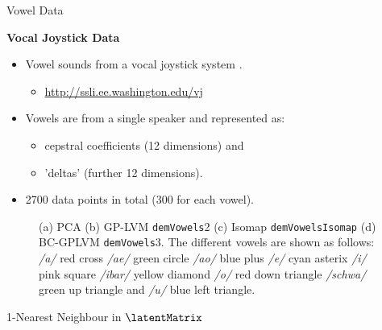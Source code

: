 Vowel Data

\textbf{Vocal Joystick Data}
\begin{itemize}
\item Vowel sounds from a vocal joystick system \cite{Bilmes:vocal06}.

\begin{itemize}
\item \url{http://ssli.ee.washington.edu/vj}
\end{itemize}
\item Vowels are from a single speaker and represented as: 

\begin{itemize}
\item cepstral coefficients (12 dimensions) and 
\item 'deltas' (further 12 dimensions).
\end{itemize}
\item 2700 data points in total (300 for each vowel).
\end{itemize}
%
\begin{figure}
\hfill{}

\hfill{}

\caption{(a) PCA (b) GP-LVM \texttt{demVowels}2 (c) Isomap \texttt{demVowelsIsomap}
(d) BC-GPLVM \texttt{demVowels}3.  The different vowels are shown
as follows: \emph{/a/} red cross \emph{/ae/} green circle \emph{/ao/}
blue plus \emph{/e/} cyan asterix \emph{/i/} pink square \emph{/ibar/}
yellow diamond \emph{/o/} red down triangle \emph{/schwa/} green up
triangle and \emph{/u/} blue left triangle.}

\end{figure}


1-Nearest Neighbour in $\latentMatrix$

